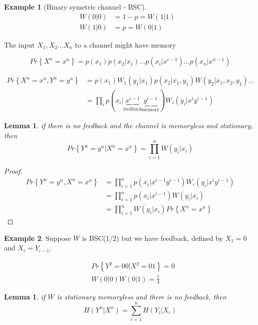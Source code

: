 \documentclass[twoside]{article}
\newtheorem{lemma}[theorem]{Lemma}
\theoremstyle{definition} %
\newtheorem{example}{Example}
\renewcommand{\Pr}[1]{Pr\left\{#1\right\}}
\begin{document}
\begin{example}[Binary symetric channel - BSC]
  \begin{align*}
    W(0|0) &= 1 - p = W(1|1)&\\
    W(1|0) &= p =W(0|1)
  \end{align*}
\end{example}

The input $X_1, X_2 \dots X_n$ to a channel might have memory

\[
  \Pr{X^n = x^n} = p(x_1)p(x_2 | x_1) \dots p(x_i | x^{i-1}) \dots p(x_n|x^{n-1})
\]

\begin{align*}
  \Pr{X^n=x^n, Y^n=y^n} &= p(x_1)W_1(y_1|x_1)p(x_2|x_1,y_1)W(y_2|x_1,x_2,y_1)\dots\\
  &= \prod_i p(x_i|
  \underbrace{x^{i-1}}_{\text{feedback}}
  \underbrace{y^{i-1}}_{\text{memory}}
  )W_i(y_i|x^iy^{i-1})
\end{align*}

\begin{lemma}
  if there is no feedback and the channel is memoryless and stationary, then
  \[
    \Pr{Y^n=y^n | X^n=x^n} = \prod_{i=1}^n W(y_i|x_i)
  \]
\end{lemma}

\begin{proof}
  \begin{align*}
    \Pr{Y^n=y^n, X^n=x^n} &= \prod_{i=1}^n p(x_i|x^{i-1}y^{i-1})W_i(y_i|x^iy^{i-1})\\
    &= \prod_{i=1}^n p(x_i|x^{i-1})W(y_i|x_i)\\
    &= \prod_{i=1}^n W(y_i|x_i) \Pr{X^n=x^n}
  \end{align*}
\end{proof}

\begin{example}
  Suppose $W$ is BSC(1/2) but we have feedback, defined by $X_1=0$ and $X_i=Y_{i-1}$.

  \begin{align*}
    &\Pr{Y^2=00|X^2=01} = 0\\
    &W(0|0)W(0|1) = \frac 1 4
  \end{align*}

\end{example}

\begin{lemma}
  if $W$ is stationary memoryless and there is no feedback, then
  \[
    H(Y^n|X^n) = \sum_{i=1}^n H(Y_i|X_i)
  \]

\end{lemma}
\end{document}
